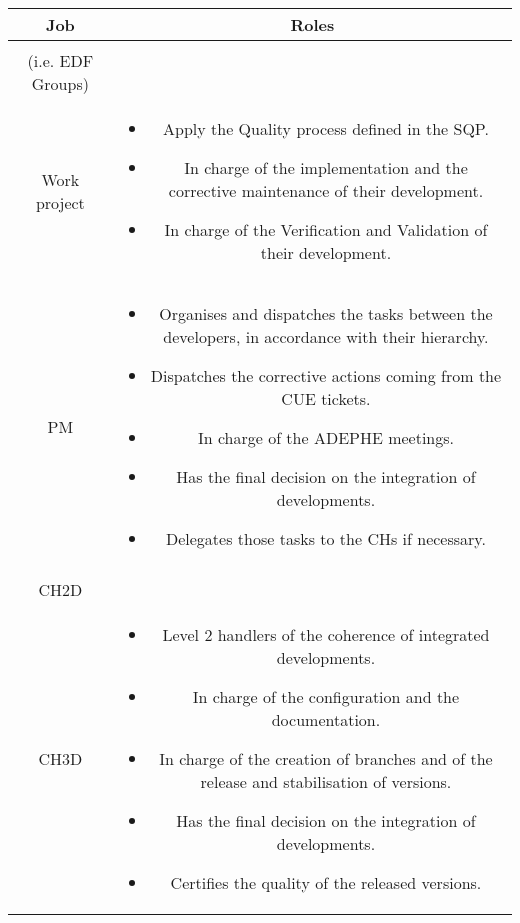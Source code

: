 \begin{table}[H]
\begin{tabular}{|c|c|}
\hline
Job & Roles \\
\hline
\minibox[c]{EDF Units\\(i.e. EDF Groups)\\Work project} &
\begin{minipage}[l]{12cm}
\begin{itemize}
\itemsep-5pt
\item Apply the Quality process defined in the SQP.
\item In charge of the implementation and the corrective maintenance of their
development.
\item In charge of the Verification and Validation of their development.
\end{itemize}
\end{minipage}\\
\hline
PM &
\begin{minipage}[l]{12cm}
\begin{itemize}
\itemsep-5pt
\item Organises and dispatches the tasks between the developers, in accordance with
their hierarchy.
\item Dispatches the corrective actions coming from the CUE tickets.
\item In charge of the ADEPHE meetings.
\item Has the final decision on the integration of developments.
\item Delegates those tasks to the CHs if necessary.
\end{itemize}
\end{minipage}\\
\hline
\minibox[c]{CH1D\\CH2D\\CH3D} &
\begin{minipage}[l]{12cm}
\begin{itemize}
\itemsep-5pt
\item Level 2 handlers of the coherence of integrated developments.
\item In charge of the configuration and the documentation.
\item In charge of the creation of branches and of the release and
stabilisation of versions.
\item Has the final decision on the integration of developments.
\item Certifies the quality of the released versions.
\end{itemize}

\end{minipage}
\end{tabular}
\end{table}
